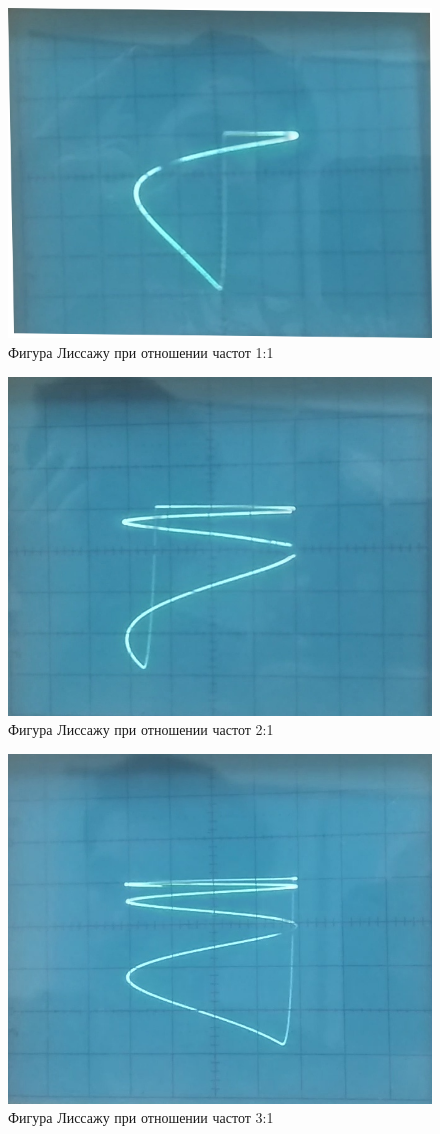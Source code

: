 \documentclass[a4paper, fontsize=14pt]{article}
\begin{document}
\begin{figure}[H]
		\includegraphics[width = 0.8\linewidth]{liss1.png}
		\caption{Фигура Лиссажу при отношении частот 1:1}
	\end{figure}
	\begin{figure}[H]
		\includegraphics[width = 0.8\linewidth]{liss2.png}
		\caption{Фигура Лиссажу при отношении частот 2:1}
	\end{figure}
	\begin{figure}[H]
		\includegraphics[width = 0.8\linewidth]{liss3.png}
		\caption{Фигура Лиссажу при отношении частот 3:1}
	\end{figure}
\end{document}
